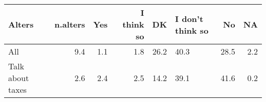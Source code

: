\begin{table}[ht]
\centering
\begin{tabular}{lrrrrL{2cm}rr}
  \hline
Alters & n.alters & Yes & I think so & DK & I don't think so & No & NA \\ 
  \hline
All & 9.4 & 1.1 & 1.8 & 26.2 & 40.3 & 28.5 & 2.2 \\ 
  Talk about taxes & 2.6 & 2.4 & 2.5 & 14.2 & 39.1 & 41.6 & 0.2 \\ 
   \hline
\end{tabular}
\end{table}
